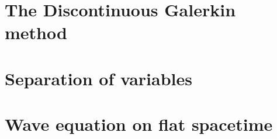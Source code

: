 \section{The Discontinuous Galerkin method}
\section{Separation of variables}
\section{Wave equation on flat spacetime}
